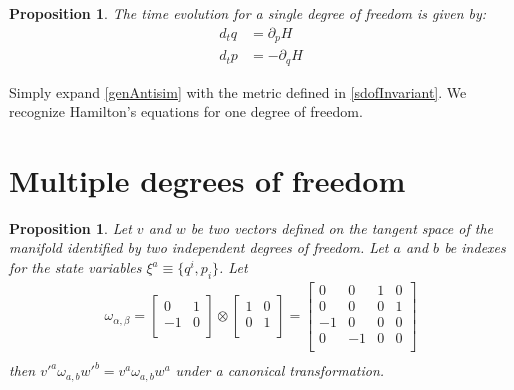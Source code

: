 \documentclass[aps,pra,10pt,twocolumn,floatfix,nofootinbib]{revtex4-1}
\newtheorem{prop}[thm]{Proposition}
\theoremstyle{definition}
\begin{document}
\begin{prop}\label{sdofHam}
The time evolution for a single degree of freedom is given by:
\begin{align*}
d_{t}q &= \partial_{p} H \\
d_{t}p &= - \partial_{q} H
\end{align*}
\end{prop}

Simply expand \ref{genAntisim} with the metric defined in \ref{sdofInvariant}. We recognize Hamilton's equations for one degree of freedom\cite{classical_dynamics}.

\section{Multiple degrees of freedom}

\begin{prop}\label{mdofInvariant}
Let $v$ and $w$ be two vectors defined on the tangent space of the manifold identified by two independent degrees of freedom. Let $a$ and $b$ be indexes for the state variables $\xi^a\equiv \{q^i, p_i\}$. Let
\begin{align*}
\omega_{\alpha, \beta} =  \left[
  \begin{array}{cc}
    0 & 1 \\
    -1 & 0 \\
  \end{array}
\right] \otimes \left[
  \begin{array}{cc}
    1 & 0 \\
    0 & 1 \\
  \end{array}
\right] =
\left[
  \begin{array}{cccc}
    0 & 0 & 1 & 0 \\
    0 & 0 & 0 & 1 \\
    -1 & 0 & 0 & 0 \\
    0 & -1 & 0 & 0 \\
  \end{array}
\right] \\
\end{align*}
then $v'^{a} \omega_{a, b} w'^{b}=v^{a} \omega_{a, b} w^{a}$ under a canonical transformation.
\end{prop}
\end{document}
